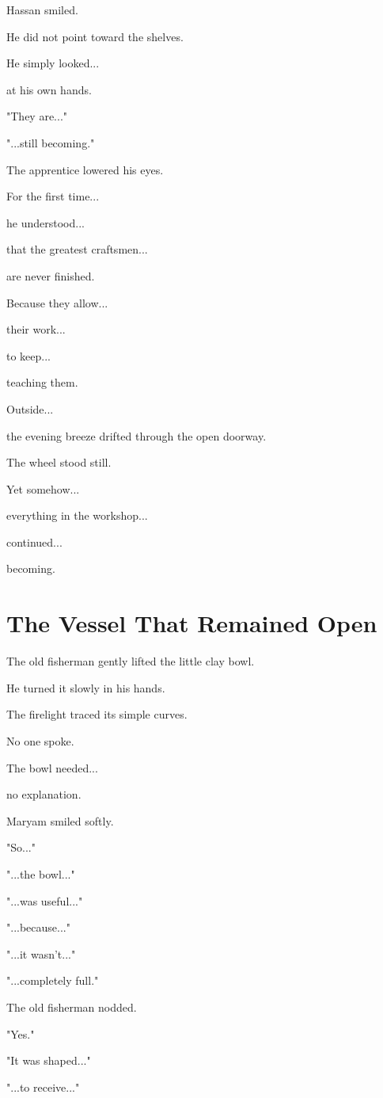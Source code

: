 \documentclass[12pt,openany]{book}
\begin{document}
Hassan smiled.

He did not point toward the shelves.

He simply looked...

at his own hands.

"They are..."

"...still becoming."

The apprentice lowered his eyes.

For the first time...

he understood...

that the greatest craftsmen...

are never finished.

Because they allow...

their work...

to keep...

teaching them.

Outside...

the evening breeze drifted through the open doorway.

The wheel stood still.

Yet somehow...

everything in the workshop...

continued...

becoming.
\section*{The Vessel That Remained Open}

The old fisherman gently lifted the little clay bowl.

He turned it slowly in his hands.

The firelight traced its simple curves.

No one spoke.

The bowl needed...

no explanation.

Maryam smiled softly.

"So..."

"...the bowl..."

"...was useful..."

"...because..."

"...it wasn't..."

"...completely full."

The old fisherman nodded.

"Yes."

"It was shaped..."

"...to receive..."
\end{document}
